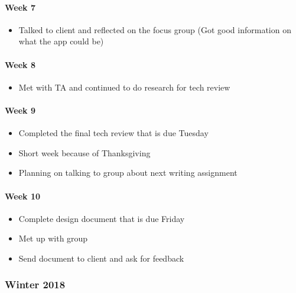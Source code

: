 \documentclass[onecolumn, draftclsnofoot,10pt, compsoc]{IEEEtran}
\begin{document}
      \paragraph{Week 7}
        \begin{itemize}
          \item Talked to client and reflected on the focus group (Got good information on what the app could be)
        \end{itemize}

      \paragraph{Week 8}
        \begin{itemize}
          \item Met with TA and continued to do research for tech review
        \end{itemize}

      \paragraph{Week 9}
        \begin{itemize}
          \item Completed the final tech review that is due Tuesday
          \item Short week because of Thanksgiving
          \item Planning on talking to group about next writing assignment
        \end{itemize}

      \paragraph{Week 10}
        \begin{itemize}
          \item Complete design document that is due Friday
          \item Met up with group
          \item Send document to client and ask for feedback
        \end{itemize}

    \subsubsection{Winter 2018}
\end{document}
